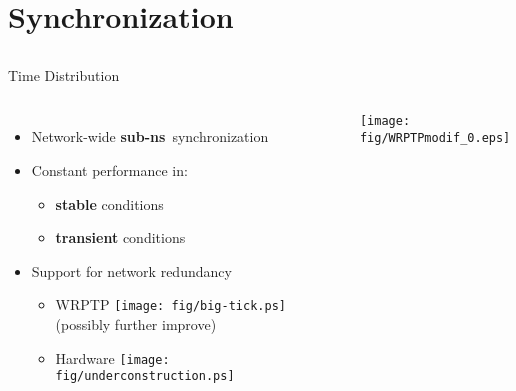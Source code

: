 \documentclass[compress,red]{beamer}
\begin{document}
\section{Synchronization}
\subsection{}
\begin{frame}{Time Distribution}

  \begin{columns}[c]

  \begin{itemize}
    \item Network-wide {\bf sub-ns}~synchronization
    \vspace{0.3cm}
    \item Constant performance in:
	\begin{itemize}
	  \item {\bf stable} conditions
	  \item {\bf transient} conditions
	\end{itemize}
    \vspace{0.3cm}
    \item Support for network redundancy
    \begin{itemize}
      \item WRPTP \texttt{[image: fig/big-tick.ps]}  (possibly further improve)
      \item Hardware \texttt{[image: fig/underconstruction.ps]}
    \end{itemize}
  \end{itemize}


      \begin{center}
	\texttt{[image: fig/WRPTPmodif\_0.eps]}
      \end{center}  
    

  \end{columns}

\end{frame}
\end{document}
